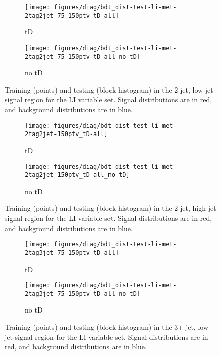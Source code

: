 {\begin{figure}[!htbp]\captionsetup{justification=centering}
  \centering
  \begin{subfigure}[t]{0.49\textwidth}\centering\texttt{[image: figures/diag/bdt\_dist-test-li-met-2tag2jet-75\_150ptv\_tD-all]}\caption{tD}\end{subfigure}
  \begin{subfigure}[t]{0.49\textwidth}\centering\texttt{[image: figures/diag/bdt\_dist-test-li-met-2tag2jet-75\_150ptv\_tD-all\_no-tD]}\caption{no tD}\end{subfigure}
  \caption{Training (points) and testing (block histogram) in the 2 jet, low jet signal region for the LI variable set.  Signal distributions are in red, and background distributions are in blue.}
  \label{fig:li-met2jet-75_150ptv-testing}
\end{figure}

\begin{figure}[!htbp]\captionsetup{justification=centering}
  \centering
  \begin{subfigure}[t]{0.49\textwidth}\centering\texttt{[image: figures/diag/bdt\_dist-test-li-met-2tag2jet-150ptv\_tD-all]}\caption{tD}\end{subfigure}
  \begin{subfigure}[t]{0.49\textwidth}\centering\texttt{[image: figures/diag/bdt\_dist-test-li-met-2tag2jet-150ptv\_tD-all\_no-tD]}\caption{no tD}\end{subfigure}
  \caption{Training (points) and testing (block histogram) in the 2 jet, high jet signal region for the LI variable set.  Signal distributions are in red, and background distributions are in blue.}
  \label{fig:li-met2jet-150ptv-testing}
\end{figure}

\begin{figure}[!htbp]\captionsetup{justification=centering}
  \centering
  \begin{subfigure}[t]{0.49\textwidth}\centering\texttt{[image: figures/diag/bdt\_dist-test-li-met-2tag3jet-75\_150ptv\_tD-all]}\caption{tD}\end{subfigure}
  \begin{subfigure}[t]{0.49\textwidth}\centering\texttt{[image: figures/diag/bdt\_dist-test-li-met-2tag3jet-75\_150ptv\_tD-all\_no-tD]}\caption{no tD}\end{subfigure}
  \caption{Training (points) and testing (block histogram) in the 3+ jet, low jet signal region for the LI variable set.  Signal distributions are in red, and background distributions are in blue.}
  \label{fig:li-met3jet-75_150ptv-testing}
\end{figure}

}
